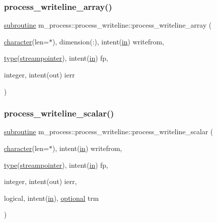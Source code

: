 \subsubsection{\texorpdfstring{process\+\_\+writeline\+\_\+array()}{process\_writeline\_array()}}
{\footnotesize\ttfamily \hyperlink{M__stopwatch_83_8txt_acfbcff50169d691ff02d4a123ed70482}{subroutine} m\+\_\+process\+::process\+\_\+writeline\+::process\+\_\+writeline\+\_\+array (\begin{DoxyParamCaption}\item[{\hyperlink{option__stopwatch_83_8txt_abd4b21fbbd175834027b5224bfe97e66}{character}(len=$\ast$), dimension(\+:), intent(\hyperlink{M__journal_83_8txt_afce72651d1eed785a2132bee863b2f38}{in})}]{writefrom,  }\item[{\hyperlink{stop__watch_83_8txt_a70f0ead91c32e25323c03265aa302c1c}{type}(\hyperlink{structm__process_1_1streampointer}{streampointer}), intent(\hyperlink{M__journal_83_8txt_afce72651d1eed785a2132bee863b2f38}{in})}]{fp,  }\item[{integer, intent(out)}]{ierr }\end{DoxyParamCaption})\hspace{0.3cm}{\ttfamily [private]}}

\mbox{\label{interfacem__process_1_1process__writeline_a9e95166556bec54fd10568f01d02f34e}} 
\subsubsection{\texorpdfstring{process\+\_\+writeline\+\_\+scalar()}{process\_writeline\_scalar()}}
{\footnotesize\ttfamily \hyperlink{M__stopwatch_83_8txt_acfbcff50169d691ff02d4a123ed70482}{subroutine} m\+\_\+process\+::process\+\_\+writeline\+::process\+\_\+writeline\+\_\+scalar (\begin{DoxyParamCaption}\item[{\hyperlink{option__stopwatch_83_8txt_abd4b21fbbd175834027b5224bfe97e66}{character}(len=$\ast$), intent(\hyperlink{M__journal_83_8txt_afce72651d1eed785a2132bee863b2f38}{in})}]{writefrom,  }\item[{\hyperlink{stop__watch_83_8txt_a70f0ead91c32e25323c03265aa302c1c}{type}(\hyperlink{structm__process_1_1streampointer}{streampointer}), intent(\hyperlink{M__journal_83_8txt_afce72651d1eed785a2132bee863b2f38}{in})}]{fp,  }\item[{integer, intent(out)}]{ierr,  }\item[{logical, intent(\hyperlink{M__journal_83_8txt_afce72651d1eed785a2132bee863b2f38}{in}), \hyperlink{option__stopwatch_83_8txt_aa4ece75e7acf58a4843f70fe18c3ade5}{optional}}]{trm }\end{DoxyParamCaption})\hspace{0.3cm}{\ttfamily [private]}}



